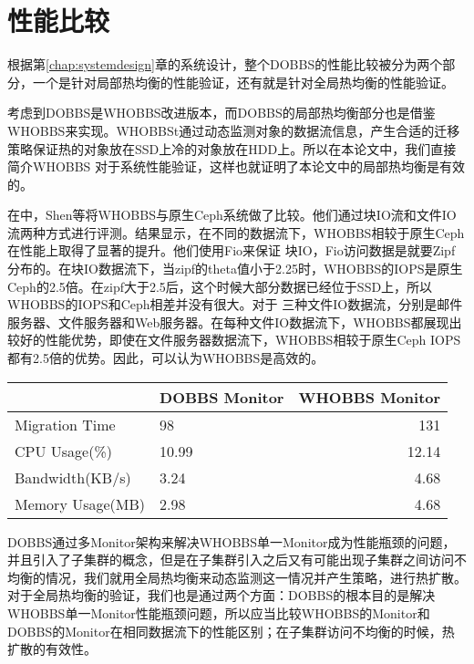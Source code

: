 \section{性能比较}
根据第\ref{chap:systemdesign}章的系统设计，整个DOBBS的性能比较被分为两个部分，一个是针对局部热均衡的性能验证，还有就是针对全局热均衡的性能验证。

考虑到DOBBS是WHOBBS改进版本，而DOBBS的局部热均衡部分也是借鉴WHOBBS来实现。WHOBBSt通过动态监测对象的数据流信息，产生合适的迁移策略保证热的对象放在SSD上冷的对象放在HDD上。所以在本论文中，我们直接简介WHOBBS
对于系统性能验证，这样也就证明了本论文中的局部热均衡是有效的。

在中，Shen等将WHOBBS与原生Ceph系统做了比较。他们通过块IO流和文件IO流两种方式进行评测。结果显示，在不同的数据流下，WHOBBS相较于原生Ceph在性能上取得了显著的提升。他们使用Fio来保证
块IO，Fio访问数据是就要Zipf分布的。在块IO数据流下，当zipf的theta值小于2.25时，WHOBBS的IOPS是原生Ceph的2.5倍。在zipf大于2.5后，这个时候大部分数据已经位于SSD上，所以WHOBBS的IOPS和Ceph相差并没有很大。对于
三种文件IO数据流，分别是邮件服务器、文件服务器和Web服务器。在每种文件IO数据流下，WHOBBS都展现出较好的性能优势，即使在文件服务器数据流下，WHOBBS相较于原生Ceph IOPS都有2.5倍的优势。因此，可以认为WHOBBS是高效的。

\begin{table}[!hpb]
    \centering
    \begin{tabular}{@{}llr@{}} \toprule
       & DOBBS Monitor & WHOBBS Monitor\\ \midrule
      Migration Time & 98 & 131 \\
      CPU Usage(\%) & 10.99 & 12.14 \\
      Bandwidth(KB/s) & 3.24 & 4.68 \\
      Memory Usage(MB) & 2.98 & 4.68 \\
    \end{tabular}
\end{table}

DOBBS通过多Monitor架构来解决WHOBBS单一Monitor成为性能瓶颈的问题，并且引入了子集群的概念，但是在子集群引入之后又有可能出现子集群之间访问不均衡的情况，我们就用全局热均衡来动态监测这一情况并产生策略，进行热扩散。
对于全局热均衡的验证，我们也是通过两个方面：DOBBS的根本目的是解决WHOBBS单一Monitor性能瓶颈问题，所以应当比较WHOBBS的Monitor和DOBBS的Monitor在相同数据流下的性能区别；在子集群访问不均衡的时候，热扩散的有效性。

